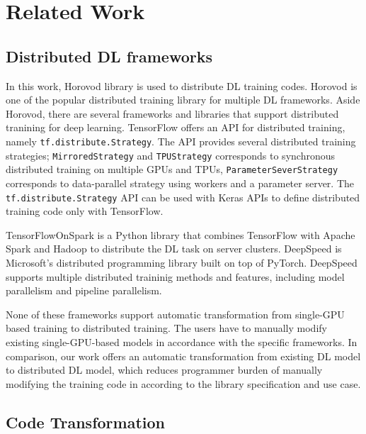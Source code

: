 \section{Related Work}\label{sec:related}

\subsection{Distributed DL frameworks}

In this work, Horovod library is used to distribute
DL training codes.
Horovod\cite{sergeev2018horovod} is one of the popular distributed training 
library for multiple DL frameworks.
Aside Horovod, there are several frameworks and libraries that support
distributed tranining for deep learning.
TensorFlow offers an API for distributed training,
namely {\tt tf.distribute.Strategy}. 
The API provides several distributed training strategies;
{\tt MirroredStrategy} and {\tt TPUStrategy} corresponds to 
synchronous distributed training on multiple GPUs and TPUs,  
{\tt ParameterSeverStrategy} corresponds to 
data-parallel strategy using workers and a parameter server.
The {\tt tf.distribute.Strategy} API can be used with Keras APIs
to define distributed training code only with TensorFlow.  

TensorFlowOnSpark\cite{tfonspark} is a Python library that
combines TensorFlow with Apache Spark and Hadoop to distribute
the DL task on server clusters. 
DeepSpeed\cite{deepspeed} is Microsoft's distributed programming library
built on top of PyTorch\cite{pytorch2019}.  
DeepSpeed supports multiple distributed traininig methods and features,
including model parallelism and pipeline parallelism. 

None of these frameworks support automatic transformation from single-GPU
based training to distributed training. 
The users have to manually modify existing single-GPU-based models
in accordance with the specific frameworks. 
In comparison, our work offers an automatic transformation from
existing DL model to distributed DL model, which reduces
programmer burden of manually modifying the training code
in according to the library specification and use case.

\subsection{Code Transformation}

